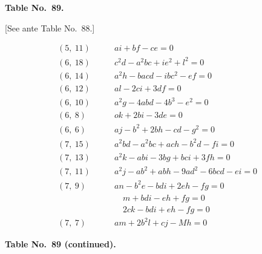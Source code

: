 \documentclass[11pt,a4paper]{article}
\begin{document}
\begin{center}
\textbf{Table No.~89.}
\end{center}

[See ante Table No.~88.]

\begin{align*}
(5,\ 11)\qquad & ai + bf - ce = 0\\[0.5em]
(6,\ 18)\qquad & c^{2}d - a^{2}bc + ie^{2} + l^{2} = 0\\
(6,\ 14)\qquad & a^{2}h - bacd - ibc^{2} - ef = 0\\
(6,\ 12)\qquad & al - 2ci + 3df = 0\\
(6,\ 10)\qquad & a^{2}g - 4abd - 4b^{3} - e^{2} = 0\\
(6,\ 8)\qquad & ok + 2bi - 3de = 0\\
(6,\ 6)\qquad & aj - b^{2} + 2bh - cd - g^{2} = 0\\[0.5em]
(7,\ 15)\qquad & a^{2}bd - a^{2}bc + ach - b^{2}d - fi = 0\\
(7,\ 13)\qquad & a^{2}k - abi - 3bg + bci + 3fh = 0\\
(7,\ 11)\qquad & a^{2}j - ab^{2} + abh - 9ad^{2} - 6bcd - ei = 0\\
(7,\ 9)\qquad & an - b^{2}e - bdi + 2eh - fg = 0\\
&\quad m + bdi - eh + fg = 0\\
&\quad 2ck - bdi + eh - fg = 0\\
(7,\ 7)\qquad & am + 2b^{2}l + cj - Mh = 0
\end{align*}

\newpage
\setcounter{page}{347}

\textbf{Table No.~89 (continued).}
\end{document}
